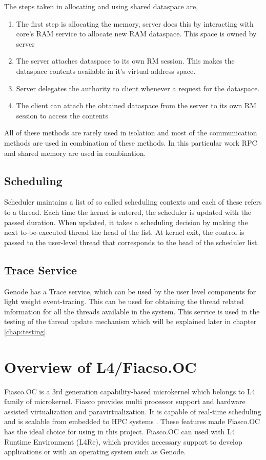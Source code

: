 The steps taken in allocating and using shared dataspace are,
\begin{enumerate}
\item The first step is allocating the memory, server does this by interacting with core's RAM service to allocate new RAM dataspace. This space is owned by server

\item The server attaches dataspace to its own RM session. This makes the dataspace contents available in it's virtual address space.

\item Server delegates the authority to client whenever a request for the dataspace.

\item The client can attach the obtained dataspace from the server to its own RM session to access the contents
\end{enumerate}

All of these methods are rarely used in isolation and most of the communication methods are used in combination of these methods. In this particular work RPC and shared memory are used in combination.

\subsection{Scheduling}
Scheduler maintains a list of so called scheduling contexts and each of these refers to a thread. Each time the kernel is entered, the scheduler is updated with the passed duration. When updated, it takes a scheduling decision by making the next to-be-executed thread the head of the list. At kernel exit, the control is passed to the user-level thread that corresponds to the head of the scheduler list.

\subsection{Trace Service}
Genode has a Trace service, which can be used by the user level components for light weight event-tracing. This can be used for obtaining the thread related information for all the threads available in the system. This service is used in the testing of the thread update mechanism which will be explained later in chapter \ref{chap:testing}.

\section{Overview of L4/Fiacso.OC}
Fiasco.OC is a 3rd generation capability-based microkernel which belongs to L4 family of microkernel. Fiasco provides multi processor support and hardware assisted virtualization and paravirtualization. It is capable of real-time scheduling and is scalable from embedded to HPC systems \cite{foc_feat}. These features made Fiasco.OC has the ideal choice for using in this project. Fiasco.OC can used with L4 Runtime Environment (L4Re), which provides necessary support to develop applications or with an operating system such as Genode.

